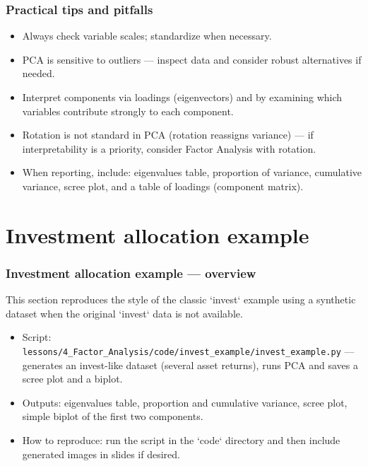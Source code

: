 \documentclass[aspectratio=169]{beamer}
\begin{document}
\begin{frame}
\frametitle{Practical tips and pitfalls}
\begin{itemize}
    \item Always check variable scales; standardize when necessary. \pause
    \item PCA is sensitive to outliers — inspect data and consider robust alternatives if needed. \pause
    \item Interpret components via loadings (eigenvectors) and by examining which variables contribute strongly to each component. \pause
    \item Rotation is not standard in PCA (rotation reassigns variance) — if interpretability is a priority, consider Factor Analysis with rotation. \pause
    \item When reporting, include: eigenvalues table, proportion of variance, cumulative variance, scree plot, and a table of loadings (component matrix). \pause
\end{itemize}
\end{frame}

\section{Investment allocation example}

\begin{frame}
\frametitle{Investment allocation example — overview}
This section reproduces the style of the classic `invest` example using a synthetic dataset when the original `invest` data is not available.
\begin{itemize}
    \item Script: \texttt{lessons/4\_Factor\_Analysis/code/invest\_example/invest\_example.py} — generates an invest-like dataset (several asset returns), runs PCA and saves a scree plot and a biplot. \pause
    \item Outputs: eigenvalues table, proportion and cumulative variance, scree plot, simple biplot of the first two components. \pause
    \item How to reproduce: run the script in the `code` directory and then include generated images in slides if desired. \pause
\end{itemize}
\vspace{6pt}
\end{frame}
\end{document}
